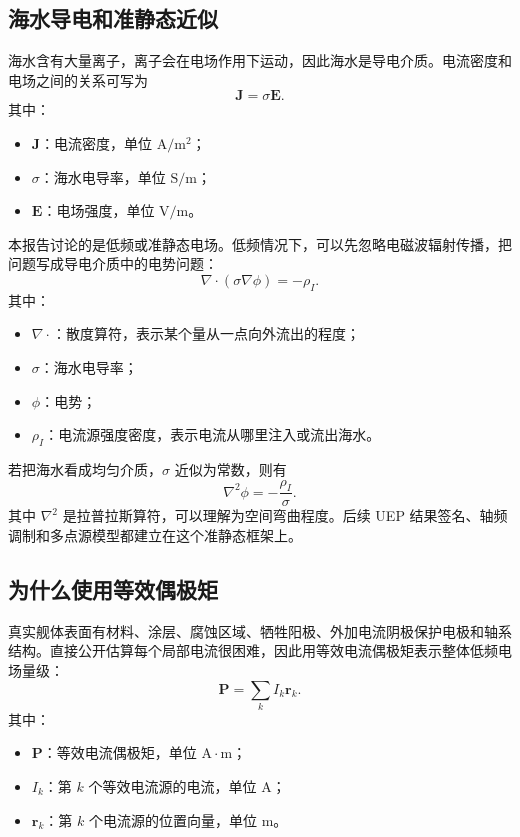 \subsection{海水导电和准静态近似}

海水含有大量离子，离子会在电场作用下运动，因此海水是导电介质。电流密度和电场之间的关系可写为
\begin{equation}
    \bm J=\sigma\bm E.
\end{equation}
其中：
\begin{itemize}
    \item $\bm J$：电流密度，单位 $\mathrm{A/m^2}$；
    \item $\sigma$：海水电导率，单位 $\mathrm{S/m}$；
    \item $\bm E$：电场强度，单位 $\mathrm{V/m}$。
\end{itemize}

本报告讨论的是低频或准静态电场。低频情况下，可以先忽略电磁波辐射传播，把问题写成导电介质中的电势问题：
\begin{equation}
    \nabla\cdot(\sigma\nabla\phi)=-\rho_I.
\end{equation}
其中：
\begin{itemize}
    \item $\nabla\cdot$：散度算符，表示某个量从一点向外流出的程度；
    \item $\sigma$：海水电导率；
    \item $\phi$：电势；
    \item $\rho_I$：电流源强度密度，表示电流从哪里注入或流出海水。
\end{itemize}

若把海水看成均匀介质，$\sigma$ 近似为常数，则有
\begin{equation}
    \nabla^2\phi=-\frac{\rho_I}{\sigma}.
\end{equation}
其中 $\nabla^2$ 是拉普拉斯算符，可以理解为空间弯曲程度。后续 UEP 结果签名、轴频调制和多点源模型都建立在这个准静态框架上。

\subsection{为什么使用等效偶极矩}

真实舰体表面有材料、涂层、腐蚀区域、牺牲阳极、外加电流阴极保护电极和轴系结构。直接公开估算每个局部电流很困难，因此用等效电流偶极矩表示整体低频电场量级：
\begin{equation}
    \bm P=\sum_k I_k\bm r_k.
\end{equation}
其中：
\begin{itemize}
    \item $\bm P$：等效电流偶极矩，单位 $\mathrm{A\cdot m}$；
    \item $I_k$：第 $k$ 个等效电流源的电流，单位 $\mathrm{A}$；
    \item $\bm r_k$：第 $k$ 个电流源的位置向量，单位 $\mathrm{m}$。
\end{itemize}

